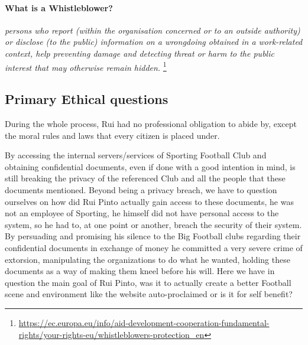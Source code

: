 \paragraph{What is a Whistleblower?}
\textit{persons who report (within the organisation concerned or to an outside authority) or disclose (to the public) information on a wrongdoing obtained in a work-related context, help preventing damage and detecting threat or harm to the public interest that may otherwise remain hidden.}
\footnote{\url{https://ec.europa.eu/info/aid-development-cooperation-fundamental-rights/your-rights-eu/whistleblowers-protection_en}}




\subsection{Primary Ethical questions}
During the whole process, Rui had no professional obligation to abide by, except the moral rules and laws that every citizen is placed under.

By accessing the internal servers/services of Sporting Football Club and obtaining confidential documents, even if done with a good intention in mind, is still breaking the privacy of the referenced Club and all the people that these documents mentioned.
Beyond being a privacy breach, we have to question ourselves on how did Rui Pinto actually gain access to these documents, he was not an employee of Sporting, he himself did not have personal access to the system, so he had to, at one point or another, breach the security of their system.
By persuading and promising his silence to the Big Football clubs regarding their confidential documents in exchange of money he committed a very severe crime of extorsion, manipulating the organizations to do what he wanted, holding these documents as a way of making them kneel before his will.
Here we have in question the main goal of Rui Pinto, was it to actually create a better Football scene and environment like the website auto-proclaimed or is it for self benefit?


